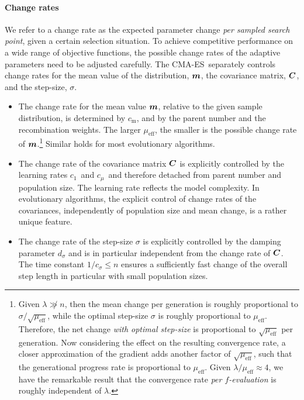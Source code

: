 \documentclass{article} %
\newcommand{\kom}[1]{}
\newcommand{\ve}[1]{\mathchoice{\mbox{\boldmath$\displaystyle#1$}}
  {\mbox{\boldmath$\textstyle#1$}} {\mbox{\boldmath$\scriptstyle#1$}}
  {\mbox{\boldmath$\scriptscriptstyle#1$}}}
\newcommand{\ma}[1]{\mathchoice{\mbox{\boldmath$\displaystyle#1$}}
  {\mbox{\boldmath$\textstyle#1$}} {\mbox{\boldmath$\scriptstyle#1$}}
  {\mbox{\boldmath$\scriptscriptstyle#1$}}}
\newcommand{\N}{\ensuremath{n}}
\newcommand{\cma}{CMA-ES}
\newcommand{\mueff}{\ensuremath{\mu_\mathrm{eff}}}
\newcommand{\lam}{\ensuremath{\lambda}}
\newcommand{\sig}{\ensuremath{\sigma}}
\newcommand{\cs}{c_\sig}
\newcommand{\ds}{d_\sig}
\newcommand{\cm}{\ensuremath{c_\mathrm{m}}}%
\newcommand{\cone}{\ensuremath{c_1}}
\newcommand{\cmu}{\ensuremath{c_\mu}}
\newcommand{\xmean}{\ensuremath{\ve{m}}}
\begin{document}
\paragraph{Change rates}
We refer to a change rate as the expected parameter change \emph{per
  sampled search point}, given a certain selection situation.  To
achieve competitive performance on a wide range of objective
functions, the possible change rates of the adaptive parameters need
to be adjusted carefully.  The \cma\ separately controls change rates
for the mean value of the distribution, $\xmean$, the covariance
matrix, $\ma{C}$, and the step-size, $\sig$.

\begin{itemize}
\item The change rate for the mean value $\xmean$, relative to the 
given sample distribution, is determined by \cm, and by the parent number and the
  recombination weights. The larger ${\mueff}$, the smaller is the
  possible change rate of $\xmean$\kom{, see \eqref{eqmueff}}.\footnote{%
  Given $\lam\not\gg\N$, then the mean change per generation is roughly 
  proportional to $\sig/\sqrt{\mueff}$, while the optimal step-size $\sig$ is roughly proportional to \mueff. 
  Therefore, the net change \emph{with optimal step-size} is proportional to 
  $\sqrt{\mueff}$ per generation. 
  Now considering the effect on the resulting convergence rate, 
  a closer approximation of the gradient adds another
  factor of $\sqrt{\mueff}$, such that the generational progress rate is 
  proportional to \mueff. Given $\lam/\mueff\approx4$, we have the remarkable
  result that the convergence 
  rate \emph{per $f$-evaluation} is roughly independent of \lam.}
  Similar holds for most evolutionary algorithms.%

  
\item The change rate of the covariance matrix $\ma{C}$ is explicitly
  controlled by the learning rates \cone\ and \cmu\ and therefore detached from
  parent number and population size. The learning rate reflects the
  model complexity. In evolutionary algorithms, the explicit control
  of change rates of the covariances, independently of population
  size and mean change, is a rather unique
  feature.

\kom{M. Sebag and A. Ducoulombier. Extending population-based
incremental learning to continuous search spaces. In Th. Back,
G. Eiben, M. Schoenauer, and H.-P. Schwefel, editors, Proceedings of
the 5 th Conference on Parallel Problems Solving from Nature, pages
418--427. Springer Verlag, 1998.}

\item The change rate of the step-size $\sig$ is explicitly controlled by the
  damping parameter $\ds$ and is in particular independent from the
  change rate of $\ma{C}$.  The time constant $1/\cs\le\N$ ensures a
  sufficiently fast change of the overall step length in particular
  with small population sizes.
\end{itemize}
\end{document}
